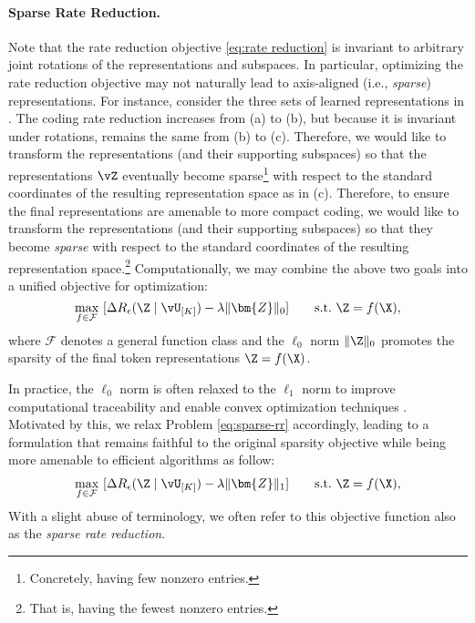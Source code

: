 \documentclass[../../book-main.tex]{subfiles}
\begin{document}
\paragraph{Sparse Rate Reduction.} Note that the rate reduction objective \eqref{eq:rate reduction} is invariant to arbitrary joint rotations of the representations and subspaces. In particular, optimizing the rate reduction objective may not naturally lead to axis-aligned (i.e., \textit{sparse}) representations. {For instance, consider the three sets of learned representations in . The coding rate reduction increases from (a) to (b), but because it is invariant under rotations, remains the same from (b) to (c).} Therefore, we would like to transform the representations (and their supporting subspaces) so that the representations $\vZ$ eventually become sparse\footnote{Concretely, having few nonzero entries.} with respect to the standard coordinates of the resulting representation space {as in (c)}. Therefore, to ensure the final representations are amenable to more compact coding, we would like to transform the representations (and their supporting subspaces) so that they become \textit{sparse} with respect to the standard coordinates of the resulting representation space.\footnote{That is, having the fewest nonzero entries.} Computationally, we may combine the above two goals into a unified objective for optimization:
\begin{equation}
   \max_{f \in \mathcal{F}}\ [\Delta R_{\epsilon}(\Z \mid \vU_{[K]}) - \lambda \|\bm{Z}\|_0] \qquad \text{s.t.}\ \Z = f(\X),
   \label{eq:sparse-rr}
\end{equation}
where $\mathcal{F}$ denotes a general function class and the $\ell_0$ norm $\|\Z\|_0$ promotes the sparsity of the final token representations \(\Z = f(\X)\).%


In practice, the $\ell_0$ norm is often relaxed to the $\ell_1$ norm to improve computational traceability and enable convex optimization techniques \cite{Wright-Ma-2022}. Motivated by this, we relax Problem \eqref{eq:sparse-rr} accordingly, leading to a formulation that remains faithful to the original sparsity objective while being more amenable to efficient algorithms as follow:  
\begin{equation}
\begin{aligned}
   \max_{f \in \mathcal{F}}\ [\Delta R_{\epsilon}(\Z \mid \vU_{[K]}) - \lambda \|\bm{Z}\|_1]  \qquad \text{s.t.}\ \Z = f(\X),
   \label{eq:sparse-rr-1}
\end{aligned}
\end{equation}
 With a slight abuse of terminology, we often refer to this objective function also as the \textit{sparse rate reduction}. 
\end{document}
